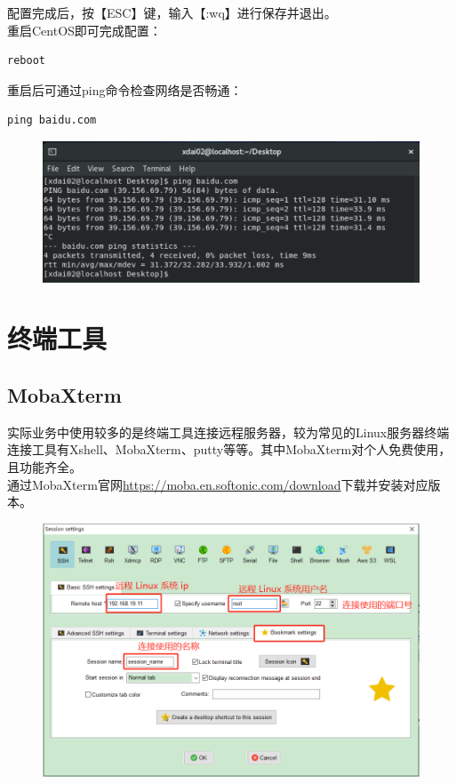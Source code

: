 \documentclass[12pt, openany, oneside]{book}
\begin{document}
配置完成后，按【ESC】键，输入【:wq】进行保存并退出。 \\

重启CentOS即可完成配置：

\vspace{-0.5cm}
\begin{lstlisting}
reboot
\end{lstlisting}

重启后可通过ping命令检查网络是否畅通：

\vspace{-0.5cm}
\begin{lstlisting}
ping baidu.com
\end{lstlisting}

\begin{figure}[H]
	\centering
	\includegraphics[scale=0.6]{img/C1/1-4/11.png}
\end{figure}

\newpage

\section{终端工具}

\subsection{MobaXterm}

实际业务中使用较多的是终端工具连接远程服务器，较为常见的Linux服务器终端连接工具有Xshell、MobaXterm、putty等等。其中MobaXterm对个人免费使用，且功能齐全。 \\

通过MobaXterm官网\url{https://moba.en.softonic.com/download}下载并安装对应版本。 \\

\begin{figure}[H]
	\centering
	\includegraphics[scale=0.4]{img/C1/1-5/1.png}
\end{figure}
\end{document}
